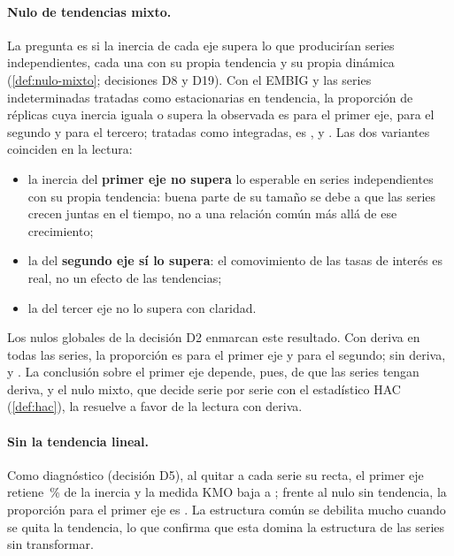 \paragraph{Nulo de tendencias mixto.} La pregunta es si la inercia de cada eje supera lo que
producirían series independientes, cada una con su propia tendencia y su propia dinámica
(\cref{def:nulo-mixto}; decisiones D8 y D19). Con el EMBIG y las series indeterminadas tratadas
como estacionarias en tendencia, la proporción de réplicas cuya inercia iguala o supera la
observada es \nuloMixtoTsPCUno{} para el primer eje, \nuloMixtoTsPCDos{} para el segundo y
\nuloMixtoTsPCTres{} para el tercero; tratadas como integradas, es \nuloMixtoDsPCUno{},
\nuloMixtoDsPCDos{} y \nuloMixtoDsPCTres{}. Las dos variantes coinciden en la lectura:

\begin{itemize}[leftmargin=*]
  \item la inercia del \textbf{primer eje no supera} lo esperable en series independientes con su
    propia tendencia: buena parte de su tamaño se debe a que las series crecen juntas en el tiempo,
    no a una relación común más allá de ese crecimiento;
  \item la del \textbf{segundo eje sí lo supera}: el comovimiento de las tasas de interés es real,
    no un efecto de las tendencias;
  \item la del tercer eje no lo supera con claridad.
\end{itemize}

Los nulos globales de la decisión D2 enmarcan este resultado. Con deriva en todas las series, la
proporción es \nuloConDerivaPCUno{} para el primer eje y \nuloConDerivaPCDos{} para el segundo; sin
deriva, \nuloSinDerivaPCUno{} y \nuloSinDerivaPCDos{}. La conclusión sobre el primer eje depende,
pues, de que las series tengan deriva, y el nulo mixto, que decide serie por serie con el
estadístico HAC (\cref{def:hac}), la resuelve a favor de la lectura con deriva.

\paragraph{Sin la tendencia lineal.} Como diagnóstico (decisión D5), al quitar a cada serie su
recta, el primer eje retiene \inerciaPCUnoSinTendencia\,\% de la inercia y la medida KMO baja a
\kmoSinTendencia{}; frente al nulo sin tendencia, la proporción para el primer eje es
\nuloSinTendenciaPCUno{}. La estructura común se debilita mucho cuando se quita la tendencia, lo
que confirma que esta domina la estructura de las series sin transformar.

